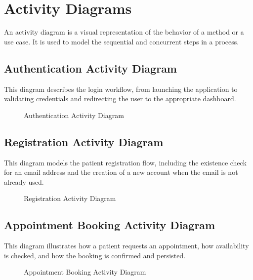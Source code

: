 \documentclass[12pt,a4paper,oneside]{report}
\begin{document}
\section{Activity Diagrams}

An activity diagram is a visual representation of the behavior of a method or a use case. It is used to model the sequential and concurrent steps in a process.

\subsection{Authentication Activity Diagram}

This diagram describes the login workflow, from launching the application to validating credentials and redirecting the user to the appropriate dashboard.

\begin{figure}[H]
    \centering
    \resizebox{0.75\textwidth}{!}{}
    \caption{Authentication Activity Diagram}
    \label{fig:activity auth}
\end{figure}

\subsection{Registration Activity Diagram}

This diagram models the patient registration flow, including the existence check for an email address and the creation of a new account when the email is not already used.

\begin{figure}[H]
    \centering
    \resizebox{0.75\textwidth}{!}{}
    \caption{Registration Activity Diagram}
    \label{fig:activity reg}
\end{figure}

\subsection{Appointment Booking Activity Diagram}

This diagram illustrates how a patient requests an appointment, how availability is checked, and how the booking is confirmed and persisted.

\begin{figure}[H]
    \centering
    \resizebox{0.75\textwidth}{!}{}
    \caption{Appointment Booking Activity Diagram}
    \label{fig:activity book}
\end{figure}
\end{document}
